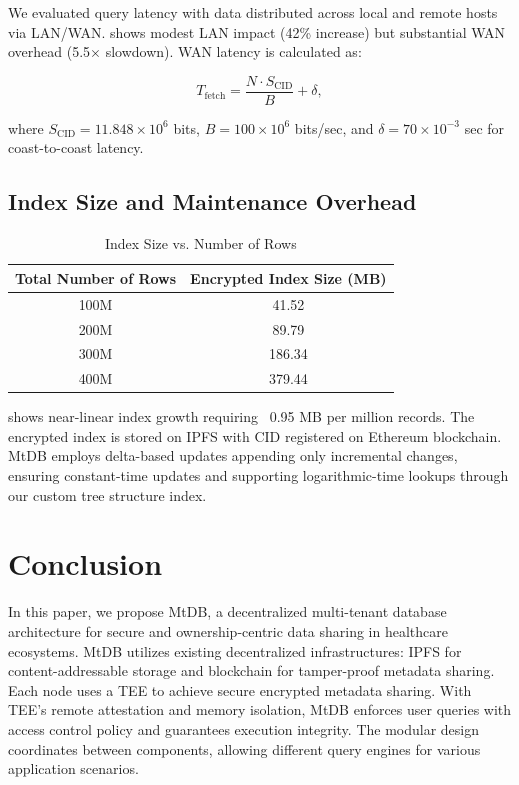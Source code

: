 \documentclass[conference]{IEEEtran}
\newcommand{\ours}{\xspace MtDB\xspace}
\begin{document}
We evaluated query latency with data distributed across local and remote hosts via LAN/WAN.  shows modest LAN impact (42\% increase) but substantial WAN overhead (5.5$\times$ slowdown). WAN latency is calculated as:

\begin{equation}
    T_{\text{fetch}} = \frac{N \cdot S_{\text{CID}}}{B} + \delta,
\end{equation}

where $S_{\text{CID}} = 11.848 \times 10^6$ bits, $B = 100 \times 10^6$ bits/sec, and $\delta = 70 \times 10^{-3}$ sec for coast-to-coast latency.

\subsection{Index Size and Maintenance Overhead}

\begin{table}[htbp]
\caption{Index Size vs. Number of Rows}
\centering
\begin{tabular}{|c|c|}
\hline
\textbf{Total Number of Rows} & \textbf{Encrypted Index Size (MB)} \\
\hline
100M & 41.52  \\
200M & 89.79  \\
300M & 186.34 \\
400M & 379.44 \\
\hline
\end{tabular}
\label{tab:index_size}
\end{table}

 shows near-linear index growth requiring ~0.95 MB per million records. The encrypted index is stored on IPFS with CID registered on Ethereum blockchain. \ours employs delta-based updates appending only incremental changes, ensuring constant-time updates and supporting logarithmic-time lookups through our custom tree structure index.

\section{Conclusion}
In this paper, we propose\ours, a decentralized multi-tenant database architecture for secure and ownership-centric data sharing in healthcare ecosystems.\ours utilizes existing decentralized infrastructures: IPFS for content-addressable storage and blockchain for tamper-proof metadata sharing. Each node uses a TEE to achieve secure encrypted metadata sharing. With TEE's remote attestation and memory isolation,\ours enforces user queries with access control policy and guarantees execution integrity. The modular design coordinates between components, allowing different query engines for various application scenarios.
\end{document}
